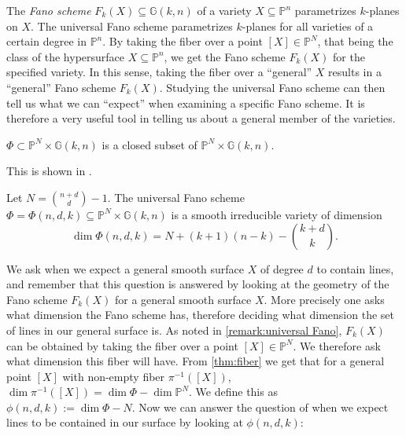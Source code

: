\begin{remark}\label{remark:universal Fano}
    The \emph{Fano scheme} $F_k(X) \subseteq \mathbb{G}(k,n)$ of a variety $X \subseteq \mathbb{P}^n$ parametrizes $k$-planes on $X$. The universal Fano scheme parametrizes $k$-planes for all varieties of a certain degree in $\mathbb{P}^n$. By taking the fiber over a point $[X] \in \mathbb{P}^N$, that being the class of the hypersurface $X \subseteq \mathbb{P}^n$, we get the Fano scheme $F_k(X)$ for the specified variety. In this sense, taking the fiber over a ``general'' $X$ results in a ``general'' Fano scheme $F_k(X)$. Studying the universal Fano scheme can then tell us what we can ``expect'' when examining a specific Fano scheme. It is therefore a very useful tool in telling us about a general member of the varieties. 
\end{remark}

\begin{lemma}
    $\Phi \subset \mathbb{P}^N \times \mathbb{G}(k,n)$ is a closed subset of $\mathbb{P}^N \times \mathbb{G}(k,n)$.
\end{lemma}
This is shown in \cite[Chapter 6]{Har92}.


\begin{proposition}\label{prop:universalFano}
    Let $N = \binom{n+d}{d}-1$. The universal Fano scheme $\Phi = \Phi(n,d,k) \subseteq \mathbb{P}^N \times \mathbb{G}(k,n)$ is a smooth irreducible variety of dimension
    \[\dim \Phi(n,d,k) = N + (k+1)(n-k) - \binom{k+d}{k}.\]
\end{proposition}

We ask when we expect a general smooth surface $X$ of degree $d$ to contain lines, and remember that this question is answered by looking at the geometry of the Fano scheme $F_k(X)$ for a general smooth surface $X$. More precisely one asks what dimension the Fano scheme has, therefore deciding what dimension the set of lines in our general surface is. As noted in \cref{remark:universal Fano}, $F_k(X)$ can be obtained by taking the fiber over a point $[X]\in \mathbb{P}^N$. We therefore ask what dimension this fiber will have. From \cref{thm:fiber} we get that for a general point $[X]$ with non-empty fiber $\pi^{-1}([X])$, $\dim \pi^{-1}([X]) = \dim \Phi - \dim \mathbb{P}^N$. We define this as $\phi(n,d,k) := \dim \Phi - N$. Now we can answer the question of when we expect lines to be contained in our surface by looking at $\phi(n,d,k)$:


